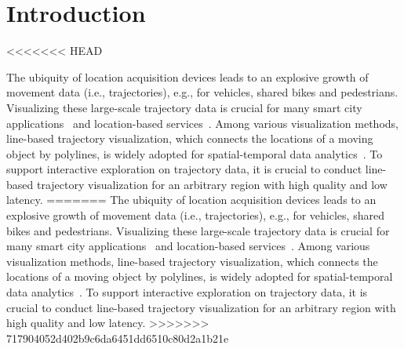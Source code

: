 \section{Introduction}\label{sec:intro}
<<<<<<< HEAD

The ubiquity of location acquisition devices leads to an explosive growth of movement data (i.e., trajectories), e.g., for vehicles, shared bikes and pedestrians. Visualizing these large-scale trajectory data is crucial for many smart city applications~\cite{wang2014visual, tang2017efficient, zheng2011learning} and location-based services~\cite{liu2016smartadp, zheng2010collaborative}. Among various visualization methods, line-based trajectory visualization, which connects the locations of a moving object by polylines, is widely adopted for spatial-temporal data analytics~\cite{chen2015survey, visualanalysis, bigchanvis}. To support interactive exploration on trajectory data, it is crucial to conduct line-based trajectory visualization for an arbitrary region with high quality and low latency.
=======
The ubiquity of location acquisition devices leads to an explosive growth of movement data (i.e., trajectories), e.g., for vehicles, shared bikes and pedestrians. Visualizing these large-scale trajectory data is crucial for many smart city applications~\cite{wang2014visual, tang2017efficient, zheng2011learning, zeng2014visualizing} and location-based services~\cite{liu2016smartadp, zheng2010collaborative}. Among various visualization methods, line-based trajectory visualization, which connects the locations of a moving object by polylines, is widely adopted for spatial-temporal data analytics~\cite{chen2015survey, visualanalysis, bigchanvis}. To support interactive exploration on trajectory data, it is crucial to conduct line-based trajectory visualization for an arbitrary region with high quality and low latency.
>>>>>>> 717904052d402b9c6da6451dd6510c80d2a1b21e

